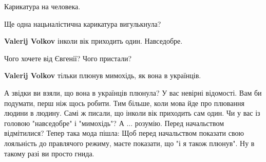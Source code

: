 \begin{itemize}
Карикатура на человека.

\begin{itemize}
 
Ще одна нацьналістична карикатура вигулькнула?

 
\textbf{Valerij Volkov} інколи вік приходить один. Навседобре.

 
Чого хочете від Євгенії?
Чого пристали?

 
\textbf{Valerij Volkov} тільки плюнув мимохідь, як вона в українців.

 

\obeycr
А звідки ви взяли, що вона в українців плюнула?
У вас невірні відомості.
Вам би подумати, перш ніж щось робити. Тим більше, коли мова йде про плювання людини в людину.
Самі ж писали, що інколи вік приходить сам один. Чи у вас із головою "навседобре" і "мимохідь"?
А ... розумію.
Перед начальством відмітилися?
Тепер така мода пішла:
Щоб перед начальством показати свою лояльність до правлячого режиму, маєте показати, що "і я також плюнув".
Ну в такому разі ви просто гнида.
\restorecr


 

\end{itemize}
\end{itemize}
